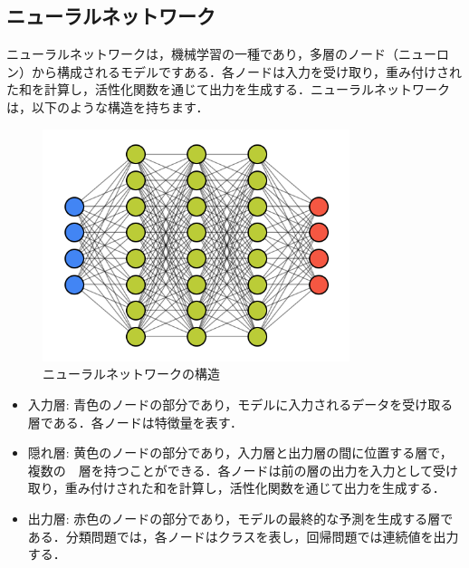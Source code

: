 
\subsection{ニューラルネットワーク}
ニューラルネットワークは，機械学習の一種であり，多層のノード（ニューロン）から構成されるモデルですある．各ノードは入力を受け取り，重み付けされた和を計算し，活性化関数を通じて出力を生成する\cite{book-deeplearning}．ニューラルネットワークは，以下のような構造を持ちます．

\begin{figure}[H]
    \centering
    \includegraphics[width=0.8\textwidth]{images/struc_NN.png}
    \caption{ニューラルネットワークの構造}
    \label{fig:adversarial_learning1}
\end{figure}

\begin{itemize}
    \item 入力層: 青色のノードの部分であり，モデルに入力されるデータを受け取る層である．各ノードは特徴量を表す．
    \item 隠れ層: 黄色のノードの部分であり，入力層と出力層の間に位置する層で，複数の　層を持つことができる．各ノードは前の層の出力を入力として受け取り，重み付けされた和を計算し，活性化関数を通じて出力を生成する．
    \item 出力層: 赤色のノードの部分であり，モデルの最終的な予測を生成する層である．分類問題では，各ノードはクラスを表し，回帰問題では連続値を出力する．
\end{itemize}

